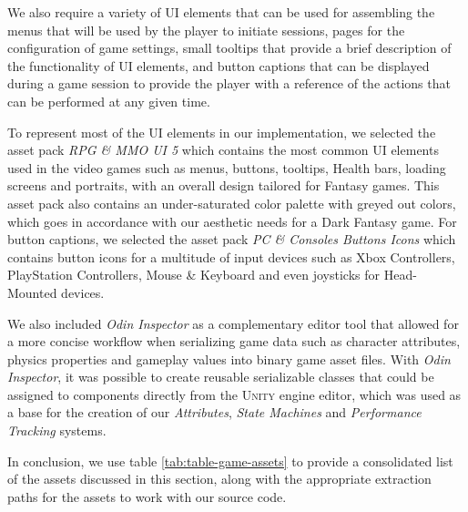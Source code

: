 We also require a variety of UI elements that can be used for assembling the menus that will be used by the player to initiate sessions, pages for the configuration of game settings, small tooltips that provide a brief description of the functionality of UI elements, and button captions that can be displayed during a game session to provide the player with a reference of the actions that can be performed at any given time.

To represent most of the UI elements in our implementation, we selected the asset pack \emph{RPG \& MMO UI 5} which contains the most common UI elements used in the video games such as menus, buttons, tooltips, Health bars, loading screens and portraits, with an overall design tailored for Fantasy games. This asset pack also contains an under-saturated color palette with greyed out colors, which goes in accordance with our aesthetic needs for a Dark Fantasy game. For button captions, we selected the asset pack \emph{PC \& Consoles Buttons Icons} which contains button icons for a multitude of input devices such as Xbox Controllers, PlayStation Controllers, Mouse \& Keyboard and even joysticks for Head-Mounted devices.

We also included \emph{Odin Inspector} as a complementary editor tool that allowed for a more concise workflow when serializing game data such as character attributes, physics properties and gameplay values into binary game asset files. With \emph{Odin Inspector}, it was possible to create reusable serializable classes that could be assigned to components directly from the \textsc{Unity} engine editor, which was used as a base for the creation of our \emph{Attributes}, \emph{State Machines} and \emph{Performance Tracking} systems.

In conclusion, we use table \ref{tab:table-game-assets} to provide a consolidated list of the assets discussed in this section, along with the appropriate extraction paths for the assets to work with our source code.

